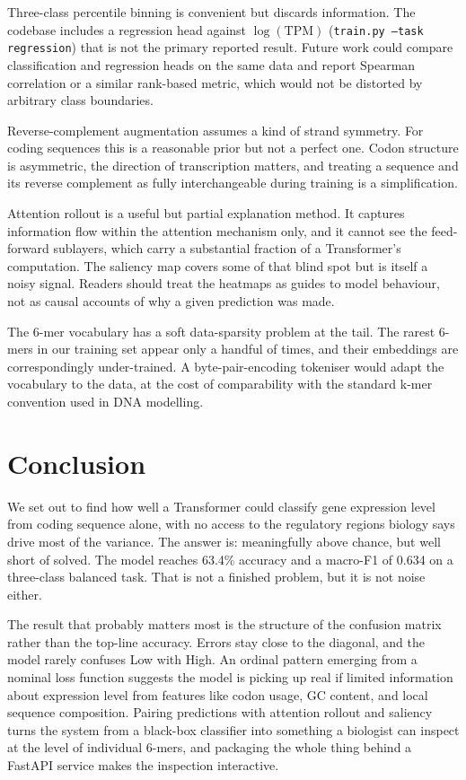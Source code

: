 \documentclass[11pt,a4paper]{article}
\begin{document}
Three-class percentile binning is convenient but discards information. The codebase includes a regression head against $\log(\text{TPM})$ (\texttt{train.py --task regression}) that is not the primary reported result. Future work could compare classification and regression heads on the same data and report Spearman correlation or a similar rank-based metric, which would not be distorted by arbitrary class boundaries.

Reverse-complement augmentation assumes a kind of strand symmetry. For coding sequences this is a reasonable prior but not a perfect one. Codon structure is asymmetric, the direction of transcription matters, and treating a sequence and its reverse complement as fully interchangeable during training is a simplification.

Attention rollout is a useful but partial explanation method. It captures information flow within the attention mechanism only, and it cannot see the feed-forward sublayers, which carry a substantial fraction of a Transformer's computation. The saliency map covers some of that blind spot but is itself a noisy signal. Readers should treat the heatmaps as guides to model behaviour, not as causal accounts of why a given prediction was made.

The 6-mer vocabulary has a soft data-sparsity problem at the tail. The rarest 6-mers in our training set appear only a handful of times, and their embeddings are correspondingly under-trained. A byte-pair-encoding tokeniser would adapt the vocabulary to the data, at the cost of comparability with the standard k-mer convention used in DNA modelling.

\section{Conclusion}

We set out to find how well a Transformer could classify gene expression level from coding sequence alone, with no access to the regulatory regions biology says drive most of the variance. The answer is: meaningfully above chance, but well short of solved. The model reaches 63.4\% accuracy and a macro-F1 of 0.634 on a three-class balanced task. That is not a finished problem, but it is not noise either.

The result that probably matters most is the structure of the confusion matrix rather than the top-line accuracy. Errors stay close to the diagonal, and the model rarely confuses Low with High. An ordinal pattern emerging from a nominal loss function suggests the model is picking up real if limited information about expression level from features like codon usage, GC content, and local sequence composition. Pairing predictions with attention rollout and saliency turns the system from a black-box classifier into something a biologist can inspect at the level of individual 6-mers, and packaging the whole thing behind a FastAPI service makes the inspection interactive.
\end{document}
